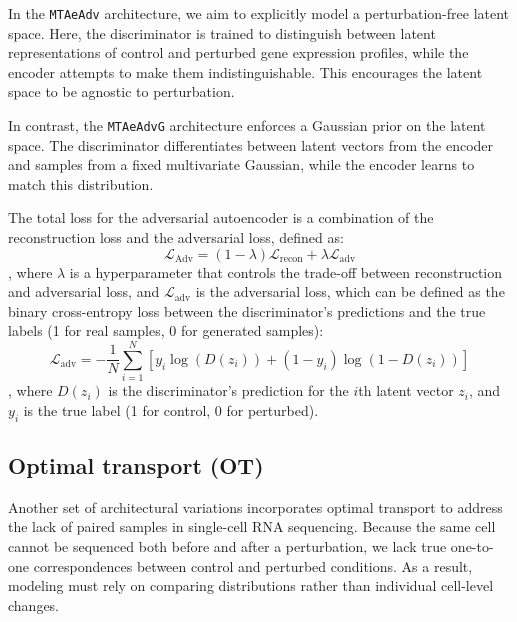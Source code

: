 \documentclass[12pt, a4paper]{article}
\begin{document}
In the \verb|MTAeAdv| architecture, we aim to explicitly model a perturbation-free latent space. Here, the discriminator is trained to distinguish between latent representations of control and perturbed gene expression profiles, while the encoder attempts to make them indistinguishable. This encourages the latent space to be agnostic to perturbation.

In contrast, the \verb|MTAeAdvG| architecture enforces a Gaussian prior on the latent space. The discriminator differentiates between latent vectors from the encoder and samples from a fixed multivariate Gaussian, while the encoder learns to match this distribution.

The total loss for the adversarial autoencoder is a combination of the reconstruction loss and the adversarial loss, defined as:
\[\mathcal{L}_{\text{Adv}} = (1 - \lambda) \mathcal{L}_{\text{recon}} +  \lambda \mathcal{L}_{\text{adv}}\]
, where $\lambda$ is a hyperparameter that controls the trade-off between reconstruction and adversarial loss, and $\mathcal{L}_{\text{adv}}$ is the adversarial loss, which can be defined as the binary cross-entropy loss between the discriminator's predictions and the true labels (1 for real samples, 0 for generated samples):
\[\mathcal{L}_{\text{adv}} = -\frac{1}{N} \sum_{i=1}^{N} \left[ y_i \log(D(z_i)) + (1 - y_i) \log(1 - D(z_i)) \right]\]
, where $D(z_i)$ is the discriminator's prediction for the $i$th latent vector $z_i$, and $y_i$ is the true label (1 for control, 0 for perturbed).


\subsection{Optimal transport (OT)}

Another set of architectural variations incorporates optimal transport to address the lack of paired samples in single-cell RNA sequencing. Because the same cell cannot be sequenced both before and after a perturbation, we lack true one-to-one correspondences between control and perturbed conditions. As a result, modeling must rely on comparing distributions rather than individual cell-level changes.
\end{document}
